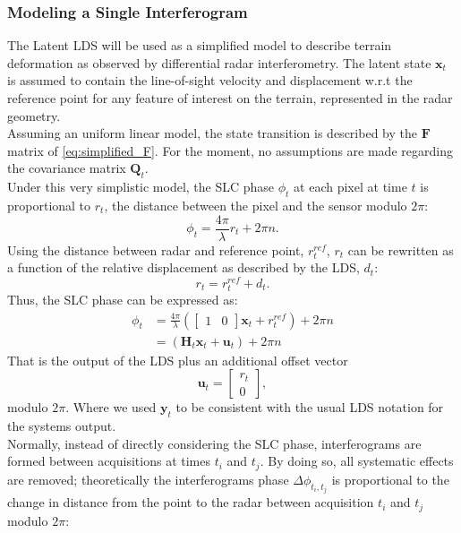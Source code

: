 \documentclass{article}
\begin{document}
\subsubsection{Modeling a Single Interferogram}
The Latent LDS will be used as a simplified model to describe terrain deformation as observed by differential radar interferometry. The latent state $\mathbf{x}_t$ is assumed to contain the line-of-sight velocity and displacement w.r.t  the reference point for any feature of interest on the terrain, represented in the radar geometry.\\ Assuming an uniform linear model, the state transition is described by the $\mathbf{F}$ matrix of \autoref{eq:simplified_F}. For the moment, no assumptions are made regarding the covariance matrix $\mathbf{Q}_t$.\\
Under this very simplistic model, the SLC phase $\phi_t$ at each pixel at time $t$ is proportional to $r_t$, the distance between the pixel and the sensor modulo $2 \pi$:
\begin{equation}
	\phi_t = \frac{4\pi}{\lambda} r_t + 2 \pi n.
\end{equation}
Using the distance between radar and reference point, $r_t^{ref}$, $r_t$ can be rewritten as a function of the relative displacement as described by the LDS, $d_t$:
\begin{equation}
	r_t = r_t^{ref} + d_t.
\end{equation}
Thus, the SLC phase can be expressed as:
\begin{equation}
	\begin{aligned}
	\phi_t  &= \frac{4\pi}{\lambda} \left(
		\begin{bmatrix}
			1 & 0
		\end{bmatrix} \mathbf{x}_{t}
		+  r_t^{ref}
		\right) + 2 \pi n\\
		 &= \left(\mathbf{H}_{t}\mathbf{x}_t + \mathbf{u}_t\right) + 2 \pi n
	\end{aligned}		
\end{equation}
That is the output of the LDS plus an additional offset vector
\begin{equation}
	\mathbf{u}_t = 
	\begin{bmatrix}
		r_{t}\\
		0
	\end{bmatrix},
\end{equation}	 modulo $2\pi$.
Where we used $\mathbf{y}_{t}$ to be consistent with the usual LDS notation for the systems output.\\
Normally, instead of directly considering the SLC phase, interferograms are formed between acquisitions at times $t_i$ and $t_j$. By doing so, all systematic effects are removed; theoretically the interferograms phase $\Delta\phi_{t_i,t_j}$ is proportional to the change in distance from the point to the radar between acquisition $t_i$ and $t_j$ modulo $2\pi$:
\end{document}
